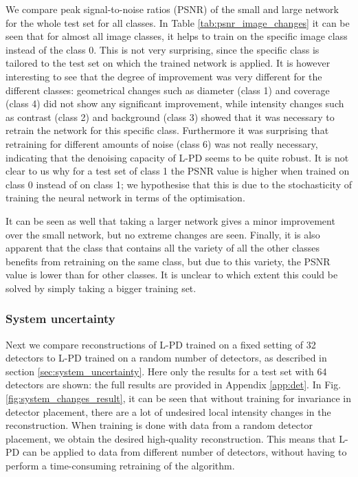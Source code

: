 \documentclass[journal]{IEEEtran}
\begin{document}
We compare peak signal-to-noise ratios (PSNR) of the small and large network for the whole test set for all classes. In Table \ref{tab:psnr_image_changes} it can be seen that for almost all image classes, it helps to train on the specific image class instead of the class 0. This is not very surprising, since the specific class is tailored to the test set on which the trained network is applied. It is however interesting to see that the degree of improvement was very different for the different classes: geometrical changes such as diameter (class 1) and coverage (class 4) did not show any significant improvement, while intensity changes such as contrast (class 2) and background (class 3) showed that it was necessary to retrain the network for this specific class. Furthermore it was surprising that retraining for different amounts of noise (class 6) was not really necessary, indicating that the denoising capacity of L-PD seems to be quite robust. {It is not clear to us why for a test set of class 1 the PSNR value is higher when trained on class 0 instead of on class 1; we hypothesise that this is due to the stochasticity of training the neural network in terms of the optimisation.}

It can be seen as well that taking a larger network gives a minor improvement over the small network, but no extreme changes are seen. Finally, it is also apparent that the class that contains all the variety of all the other classes benefits from retraining on the same class, but due to this variety, the PSNR value is lower than for other classes. It is unclear to which extent this could be solved by simply taking a bigger training set. 

\subsubsection{System uncertainty} Next we compare reconstructions of L-PD trained on a fixed setting of 32 detectors to L-PD trained on a random number of detectors, as described in section \ref{sec:system_uncertainty}. {Here only the results for a test set with 64 detectors are shown: the full results are provided in Appendix \ref{app:det}.} In Fig. \ref{fig:system_changes_result}, it can be seen that without training for invariance in detector placement, {there are a lot of undesired local intensity changes in the reconstruction. When training is done with data from a random detector placement, we obtain the desired high-quality reconstruction. This means that L-PD can be applied to data from different number of detectors, without having to perform a time-consuming retraining of the algorithm. }
\end{document}
